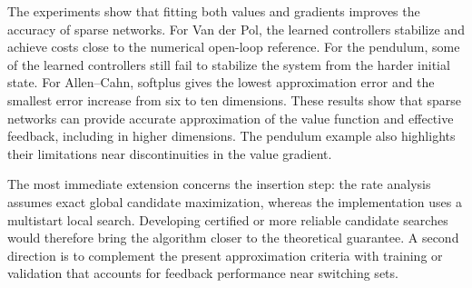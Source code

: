 \documentclass[11pt]{amsart}
\theoremstyle{definition}
\theoremstyle{remark}
\begin{document}
The experiments show that fitting both values and gradients improves the
accuracy of sparse networks. For Van der Pol, the learned controllers
stabilize and achieve costs close to the numerical open-loop reference. For the pendulum,
some of the learned controllers still fail to
stabilize the system from the harder initial state. For Allen--Cahn,
softplus gives the lowest approximation error and the smallest error
increase from six to ten dimensions.
These results show that sparse networks can provide accurate approximation of the value function
and effective feedback, including in higher dimensions.
The pendulum example also highlights their limitations near discontinuities
in the value gradient.

The most immediate extension concerns the insertion step: the rate analysis
assumes exact global candidate maximization, whereas the implementation uses a
multistart local search. Developing certified or more reliable candidate
searches would therefore bring the algorithm closer to the theoretical
guarantee. A second direction is to complement the present approximation
criteria with training or validation that accounts for feedback performance near
switching sets.

\newpage


\end{document}
